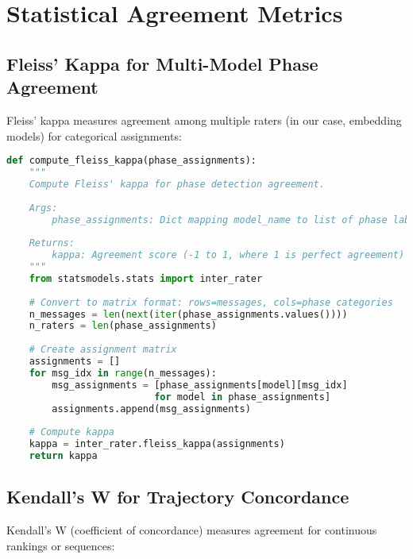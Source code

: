 \documentclass[11pt,letterpaper]{article}
\begin{document}
\section{Statistical Agreement Metrics}
\label{app:agreement-metrics}

\subsection{Fleiss' Kappa for Multi-Model Phase Agreement}

Fleiss' kappa measures agreement among multiple raters (in our case, embedding models) for categorical assignments:

\begin{lstlisting}[language=Python]
def compute_fleiss_kappa(phase_assignments):
    """
    Compute Fleiss' kappa for phase detection agreement.
    
    Args:
        phase_assignments: Dict mapping model_name to list of phase labels
    
    Returns:
        kappa: Agreement score (-1 to 1, where 1 is perfect agreement)
    """
    from statsmodels.stats import inter_rater
    
    # Convert to matrix format: rows=messages, cols=phase categories
    n_messages = len(next(iter(phase_assignments.values())))
    n_raters = len(phase_assignments)
    
    # Create assignment matrix
    assignments = []
    for msg_idx in range(n_messages):
        msg_assignments = [phase_assignments[model][msg_idx] 
                          for model in phase_assignments]
        assignments.append(msg_assignments)
    
    # Compute kappa
    kappa = inter_rater.fleiss_kappa(assignments)
    return kappa
\end{lstlisting}

\subsection{Kendall's W for Trajectory Concordance}

Kendall's W (coefficient of concordance) measures agreement for continuous rankings or sequences:
\end{document}
